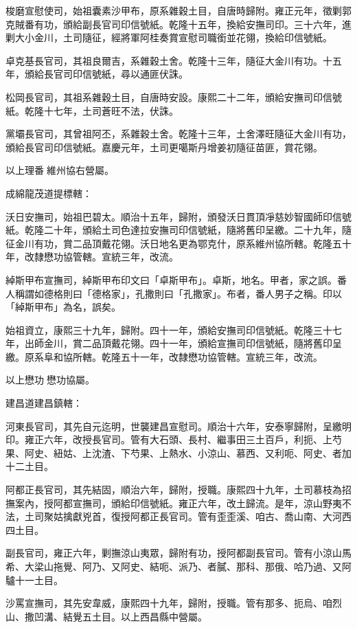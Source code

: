 \begin{pinyinscope}
梭磨宣慰使司，始祖囊素沙甲布，原系雜穀土目，自唐時歸附。雍正元年，徵剿郭克賊番有功，頒給副長官司印信號紙。乾隆十五年，換給安撫司印。三十六年，進剿大小金川，土司隨征，經將軍阿桂奏賞宣慰司職銜並花翎，換給印信號紙。

卓克基長官司，其祖良爾吉，系雜穀土舍。乾隆十三年，隨征大金川有功。十五年，頒給長官司印信號紙，尋以通匪伏誅。

松岡長官司，其祖系雜穀土目，自唐時安設。康熙二十二年，頒給安撫司印信號紙。乾隆十七年，土司蒼旺不法，伏誅。

黨壩長官司，其曾祖阿丕，系雜穀土舍。乾隆十三年，土舍澤旺隨征大金川有功，頒給長官司印信號紙。嘉慶元年，土司更噶斯丹增姜初隨征苗匪，賞花翎。

以上理番維州協右營屬。

成綿龍茂道提標轄：

沃日安撫司，始祖巴碧太。順治十五年，歸附，頒發沃日貫頂凈慈妙智國師印信號紙。乾隆二十年，頒給土司色達拉安撫司印信號紙，隨將舊印呈繳。二十九年，隨征金川有功，賞二品頂戴花翎。沃日地名更為鄂克什，原系維州協所轄。乾隆五十年，改隸懋功協管轄。宣統三年，改流。

綽斯甲布宣撫司，綽斯甲布印文曰「卓斯甲布」。卓斯，地名。甲者，家之誤。番人稱謂如德格則曰「德格家」，孔撒則曰「孔撒家」。布者，番人男子之稱。印以「綽斯甲布」為名，誤矣。

始祖資立，康熙三十九年，歸附。四十一年，頒給安撫司印信號紙。乾隆三十七年，出師金川，賞二品頂戴花翎。四十一年，頒給宣撫司印信號紙，隨將舊印呈繳。原系阜和協所轄。乾隆五十一年，改隸懋功協管轄。宣統三年，改流。

以上懋功懋功協屬。

建昌道建昌鎮轄：

河東長官司，其先自元迄明，世襲建昌宣慰司。順治十六年，安泰寧歸附，呈繳明印。雍正六年，改授長官司。管有大石頭、長村、繼事田三土百戶，利扼、上芍果、阿史、紐姑、上沈渣、下芍果、上熱水、小涼山、慕西、又利呃、阿史、者加十二土目。

阿都正長官司，其先結固，順治六年，歸附，授職。康熙四十九年，土司慕枝為招撫案內，授阿都宣撫司，頒給印信號紙。雍正六年，改土歸流。是年，涼山野夷不法，土司聚姑擒獻兇首，復授阿都正長官司。管有歪歪溪、咱古、喬山南、大河西四土目。

副長官司，雍正六年，剿撫涼山夷眾，歸附有功，授阿都副長官司。管有小涼山馬希、大梁山拖覺、阿乃、又阿史、結呃、派乃、者膩、那科、那俄、哈乃過、又阿驢十一土目。

沙罵宣撫司，其先安韋威，康熙四十九年，歸附，授職。管有那多、扼烏、咱烈山、撒凹溝、結覺五土目。以上西昌縣中營屬。


\end{pinyinscope}
